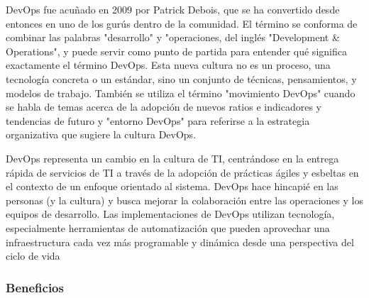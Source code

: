 \documentclass[preprint,12pt]{elsarticle}
\begin{document}
DevOps fue acuñado en 2009 por Patrick Debois, que se ha convertido desde entonces en uno de los gurús dentro de la comunidad. El término se conforma de combinar las palabras "desarrollo" y "operaciones, del inglés "Development \& Operations", y puede servir como punto de partida para entender qué significa exactamente el término DevOps. Esta nueva cultura no es un proceso, una tecnología concreta o un estándar, sino un conjunto de técnicas, pensamientos, y modelos de trabajo. También se utiliza el término "movimiento DevOps" cuando se habla de temas acerca de la adopción de nuevos ratios e indicadores y tendencias de futuro y "entorno DevOps" para referirse a la estrategia organizativa que sugiere la cultura DevOps. \cite{Walls2013} 

DevOps representa un cambio en la cultura de TI, centrándose en la entrega rápida de servicios de TI a través de la adopción de prácticas ágiles y esbeltas en el contexto de un enfoque orientado al sistema. DevOps hace hincapié en las personas (y la cultura) y busca mejorar la colaboración entre las operaciones y los equipos de desarrollo. Las implementaciones de DevOps utilizan tecnología, especialmente herramientas de automatización que pueden aprovechar una infraestructura cada vez más programable y dinámica desde una perspectiva del ciclo de vida  \cite{Gartner} 

\subsubsection{\textbf{Beneficios}}
\end{document}
